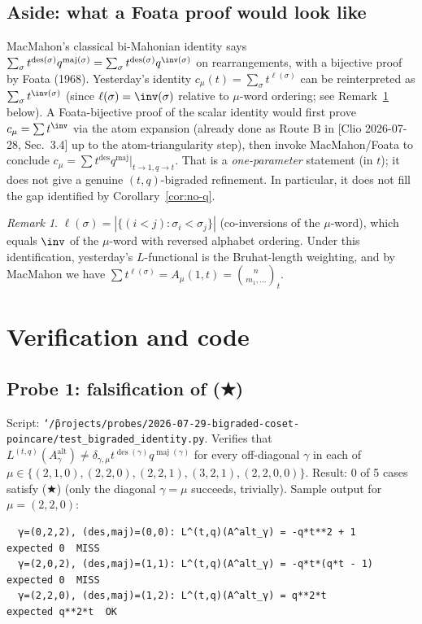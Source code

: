 \documentclass[11pt]{article}
\theoremstyle{definition}
\theoremstyle{remark}
\newtheorem{remark}[theorem]{Remark}
\newcommand{\des}{\operatorname{des}}
\newcommand{\maj}{\operatorname{maj}}
\newcommand{\Aalt}{A^{\mathrm{alt}}}
\begin{document}
\subsection{Aside: what a Foata proof would look like}\label{sec:foata}

MacMahon's classical bi-Mahonian identity says $\sum_\sigma t^{\des(\sigma)} q^{\maj(\sigma)}
= \sum_\sigma t^{\des(\sigma)} q^{\inv(\sigma)}$ on rearrangements, with a
bijective proof by Foata (1968). Yesterday's identity $c_\mu(t) = \sum_\sigma
t^{\ell(\sigma)}$ can be reinterpreted as $\sum_\sigma t^{\inv(\sigma)}$
(since $\ell(\sigma) = \inv(\sigma)$ relative to $\mu$-word ordering; see
Remark~\ref{rem:inv} below). A Foata-bijective proof of the scalar identity
would first prove $c_\mu = \sum t^{\inv}$ via the atom expansion (already
done as Route B in [Clio 2026-07-28, Sec.\ 3.4] up to the atom-triangularity
step), then invoke MacMahon/Foata to conclude
$c_\mu = \sum t^{\des} q^{\maj}\big|_{t\to 1, q\to t}$. That is a
\emph{one-parameter} statement (in $t$); it does not give a genuine
$(t,q)$-bigraded refinement. In particular, it does not fill the gap
identified by Corollary~\ref{cor:no-q}.

\begin{remark}\label{rem:inv}
$\ell(\sigma) = |\{(i<j) : \sigma_i < \sigma_j\}|$ (co-inversions of the
$\mu$-word), which equals $\inv$ of the $\mu$-word with reversed alphabet
ordering. Under this identification, yesterday's $L$-functional is the
Bruhat-length weighting, and by MacMahon we have
$\sum t^{\ell(\sigma)} = A_\mu(1,t) = \binom{n}{m_1,\ldots}_t$.
\end{remark}

\section{Verification and code}

\subsection{Probe 1: falsification of (★)}
Script: \texttt{\char`\~/projects/probes/2026-07-29-bigraded-coset-poincare/test\_bigraded\_identity.py}.
Verifies that $L^{(t,q)}(\Aalt_\gamma) \ne \delta_{\gamma,\mu} t^{\des(\gamma)}
q^{\maj(\gamma)}$ for every off-diagonal $\gamma$ in each of
$\mu \in \{(2,1,0),(2,2,0),(2,2,1),(3,2,1),(2,2,0,0)\}$.
Result: 0 of 5 cases satisfy (★) (only the diagonal $\gamma=\mu$ succeeds,
trivially). Sample output for $\mu = (2,2,0)$:
\begin{verbatim}
  γ=(0,2,2), (des,maj)=(0,0): L^(t,q)(A^alt_γ) = -q*t**2 + 1     expected 0  MISS
  γ=(2,0,2), (des,maj)=(1,1): L^(t,q)(A^alt_γ) = -q*t*(q*t - 1)  expected 0  MISS
  γ=(2,2,0), (des,maj)=(1,2): L^(t,q)(A^alt_γ) = q**2*t          expected q**2*t  OK
\end{verbatim}
\end{document}
